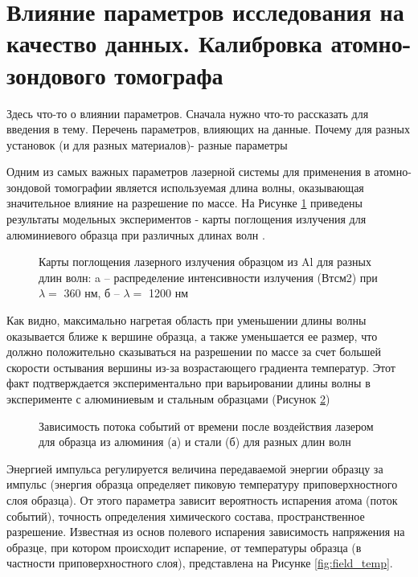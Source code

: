 \section{Влияние параметров исследования на качество данных. Калибровка атомно-зондового томографа}\label{sec:ch1/sec5}

Здесь что-то о влиянии параметров.
Сначала нужно что-то рассказать для введения в тему.
Перечень параметров, влияющих на данные.
Почему для разных установок (и для разных материалов)- разные параметры

Одним из самых важных параметров лазерной системы для применения в атомно-зондовой томографии является используемая длина волны, оказывающая значительное влияние на разрешение по массе. На Рисунке \cref{fig:Wavelength} приведены результаты модельных экспериментов - карты поглощения излучения для алюминиевого образца при различных длинах волн \cite{Houard10}.

\begin{figure}[htb]
	\caption{Карты поглощения лазерного излучения образцом из Al для разных длин волн: a – распределение интенсивности излучения (Втсм2) при $\lambda = $ 360 нм,    б – $\lambda = $ 1200 нм \cite{Houard10}}
	\label{fig:Wavelength}
\end{figure}
Как видно, максимально нагретая область при уменьшении длины волны оказывается ближе к вершине образца, а также уменьшается ее размер, что должно положительно сказываться на разрешении по массе за счет большей скорости остывания вершины из-за возрастающего градиента температур. Этот факт подтверждается экспериментально при варьировании длины волны в эксперименте \cite{Houard10} с алюминиевым и стальным образцами (Рисунок \cref{fig:WavelengthSteelAlum})

\begin{figure}[htb]
	\caption{Зависимость потока событий от времени после воздействия лазером для образца из алюминия (а) и стали (б) для разных длин волн \cite{Houard10}}
	\label{fig:WavelengthSteelAlum}
\end{figure}

Энергией импульса регулируется величина передаваемой энергии образцу за импульс (энергия образца определяет пиковую температуру приповерхностного слоя образца). От этого параметра зависит вероятность испарения атома (поток событий), точность определения химического состава, пространственное разрешение. Известная из основ полевого испарения \cite{GaultBOOK} зависимость напряжения на образце, при котором происходит испарение, от температуры образца (в частности приповерхностного слоя), представлена на Рисунке \cref{fig:field_temp}.

